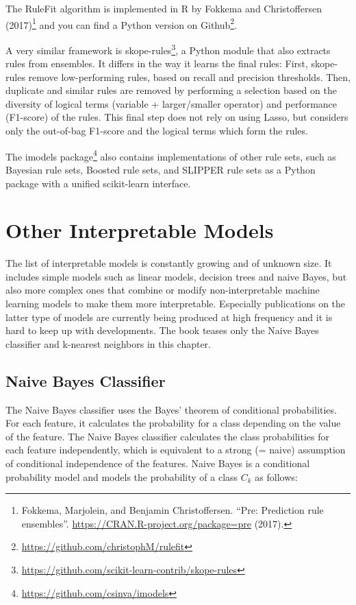 \documentclass[
  11pt,
]{scrbook}
\renewcommand{\href}[2]{#2\footnote{\url{#1}}}
\begin{document}
The RuleFit algorithm is implemented in R by Fokkema and Christoffersen (2017)\footnote{Fokkema, Marjolein, and Benjamin Christoffersen. ``Pre: Prediction rule ensembles''. \url{https://CRAN.R-project.org/package=pre} (2017).} and you can find a \href{https://github.com/christophM/rulefit}{Python version on Github}.

A very similar framework is \href{https://github.com/scikit-learn-contrib/skope-rules}{skope-rules}, a Python module that also extracts rules from ensembles.
It differs in the way it learns the final rules:
First, skope-rules remove low-performing rules, based on recall and precision thresholds.
Then, duplicate and similar rules are removed by performing a selection based on the diversity of logical terms (variable + larger/smaller operator) and performance (F1-score) of the rules.
This final step does not rely on using Lasso, but considers only the out-of-bag F1-score and the logical terms which form the rules.

The \href{https://github.com/csinva/imodels}{imodels package} also contains implementations of other rule sets, such as Bayesian rule sets, Boosted rule sets, and SLIPPER rule sets as a Python package with a unified scikit-learn interface.

\newpage

\hypertarget{other-interpretable}{%
\section{Other Interpretable Models}\label{other-interpretable}}

The list of interpretable models is constantly growing and of unknown size.
It includes simple models such as linear models, decision trees and naive Bayes, but also more complex ones that combine or modify non-interpretable machine learning models to make them more interpretable.
Especially publications on the latter type of models are currently being produced at high frequency and it is hard to keep up with developments.
The book teases only the Naive Bayes classifier and k-nearest neighbors in this chapter.

\hypertarget{naive-bayes-classifier}{%
\subsection{Naive Bayes Classifier}\label{naive-bayes-classifier}}

The Naive Bayes classifier uses the Bayes' theorem of conditional probabilities.
For each feature, it calculates the probability for a class depending on the value of the feature.
The Naive Bayes classifier calculates the class probabilities for each feature independently, which is equivalent to a strong (= naive) assumption of conditional independence of the features.
Naive Bayes is a conditional probability model and models the probability of a class \(C_k\) as follows:
\end{document}
